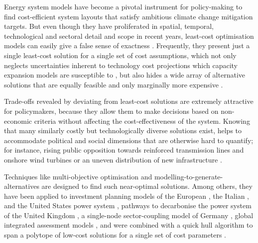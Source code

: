 
Energy system models have become a pivotal instrument for policy-making to find
cost-efficient system layouts that satisfy ambitious climate change mitigation
targets. But even though they have proliferated in spatial, temporal,
technological and sectoral detail and scope in recent years, least-cost
optimisation models can easily give a false sense of exactness
\cite{Trutnevyte2016, pye_modelling_2020}. Frequently, they present just a
single least-cost solution for a single set of cost assumptions, which not only
neglects uncertainties inherent to technology cost projections which capacity
expansion models are susceptible to \cite{trondle_trade-offs_2020, yue_review_2018,
pye_assessing_2018}, but also hides a wide array of alternative solutions that
are equally feasible and only marginally more expensive \cite{nearoptimal,
lombardi_policy_2020, sasse_regional_2020}.


Trade-offs revealed by deviating from least-cost solutions are extremely
attractive for policymakers, because they allow them to make decisions based on
non-economic criteria without affecting the cost-effectiveness of the system.
Knowing that many similarly costly but technologically diverse solutions exist,
helps to accommodate political and social dimensions that are otherwise hard to
quantify; for instance, rising public opposition towards reinforced transmission
lines and onshore wind turbines or an uneven distribution of new infrastructure
\cite{mccollum_energy_2020,sasse_regional_2020,schlachtberger_cost_2018}.


Techniques like multi-objective optimisation and
modelling-to-generate-alternatives are designed to find such near-optimal
solutions. Among others, they have been applied to investment planning models of
the European \cite{nearoptimal}, the Italian 
\cite{lombardi_policy_2020}, and the United States power system
\cite{DeCarolis2016}, pathways to decarbonise the power system of the United
Kingdom \cite{Li2017}, a single-node sector-coupling model of Germany
\cite{nacken_integrated_2019}, global integrated assessment models
\cite{Price2017}, and were combined with a quick hull algorithm to span a
polytope of low-cost solutions for a single set of cost parameters
\cite{pedersen_modeling_2020}.


